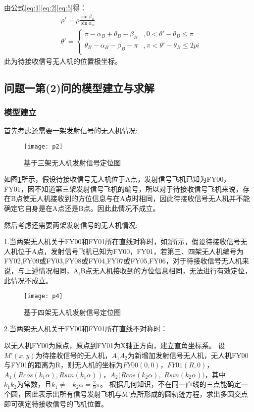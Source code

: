 \documentclass{cumcmthesis}
\begin{document}
由公式\cref{eq:1}\cref{eq:2}\cref{eq:5}得：
\begin{equation}
	\begin{aligned}
	&\rho'=\rho \frac{\sin \beta_{B}}{\sin \alpha_{B}} 
	\\
	&\theta'=
		\begin{cases}
		\pi-\alpha_{B}+\theta_{B}-\beta_{B} &, 0< \theta'-\theta_{B}  \le \pi  \\
		\theta_{B}-\alpha_{B}-\beta_{B}-\pi &, \pi< \theta'-\theta_{B}  \le 2pi  \\
		\end{cases}
	\end{aligned}
	\label{eq:9}
\end{equation}
此为待接收信号无人机的位置极坐标。

\subsection{问题一第(2)问的模型建立与求解}
\subsubsection{模型建立}
首先考虑还需要一架发射信号的无人机情况:
\begin{figure}[!h]
	\centering
	\texttt{[image: p2]}
	\caption{基于三架无人机发射信号定位图}
	\label{fig:p2}
\end{figure}

如图\cref{fig:p2}所示，假设待接收信号无人机位于A点，发射信号飞机已知为FY00，FY01，因不知道第三架发射信号飞机的编号，所以对于待接收信号飞机来说，存在B点使无人机接收到的方位信息与在A点时相同，因此待接收信号无人机并不能确定它自身是在A点还是B点。因此此情况不成立。

然后考虑还需要两架发射信号的无人机情况:

1.当两架无人机关于FY00和FY01所在直线对称时，如\cref{fig:p4}所示，假设待接收信号无人机位于A点，发射信号飞机已知为FY00，FY01，若第三、四架无人机编号为{FY02,FY09}或{FY03,FY08}或{FY04,FY07}或{FY05,FY06}，对于待接收信号无人机来说，与上述情况相同，A,B点无人机接收到的方位信息相同，无法进行有效定位，此情况不成立。
\begin{figure}[H]
	\centering
	\texttt{[image: p4]}
	\caption{基于四架无人机发射信号定位图}
	\label{fig:p4}
\end{figure}

2.当两架无人机关于FY00和FY01所在直线不对称时：

以无人机FY00为原点，原点到FY01为X轴正方向，建立直角坐标系。
设$M'(x,y)$为待接收信号的无人机，$A_1 A_2$为新增加发射信号无人机，无人机FY00与FY01的距离为R，则无人机的坐标为$FY00(0,0)$，$FY01(R,0)$，$A_1(Rcos(k_1\alpha),Rsin(k_1\alpha))$，$A_2(Rcos(k_2\alpha),$ $Rsin(k_2\alpha))$，其中$k_1 k_2\text{为常数，且}k_1 \ne -k_2\alpha=\frac{2}{9} \pi$。
根据几何知识，不在同一直线的三点能确定一个圆，因此表示出所有信号发射飞机与M'点所形成的圆轨迹方程，求出多圆交点即可确定待接收信号的飞机位置。
\end{document}
